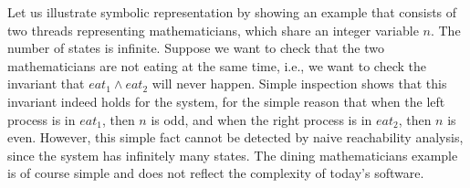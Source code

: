 
Let us illustrate symbolic representation by showing an example that consists of two threads representing mathematicians, which share an integer variable
$n$. The number of
states is infinite. Suppose we want to check that the two
mathematicians are not eating at the same time, i.e., we want to
check the invariant that
$eat_1 \land eat_2$ will never happen. Simple inspection shows that this invariant indeed holds
for the system, for the simple reason that
when the left process is in $eat_1$, then $n$ is odd, and
when the right process is in $eat_2$, then $n$ is even.
However, this simple fact cannot be detected by naive reachability analysis,
since the system has infinitely many states. The dining mathematicians example is of course simple and does not reflect the complexity of today’s software. 

